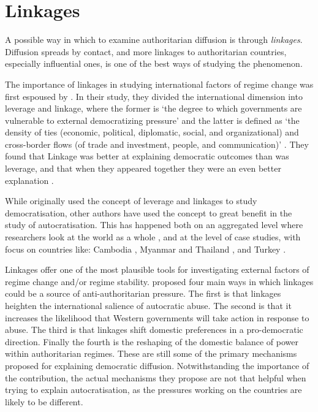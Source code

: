 \section{Linkages}
A possible way in which to examine authoritarian diffusion is through \textit{linkages}. Diffusion spreads by contact, and more linkages to authoritarian countries, especially influential ones, is one of the best ways of studying the phenomenon. 

The importance of linkages in studying international factors of regime change was first espoused by \citet{levitsky_linkage_2006}. In their study, they divided the international dimension into leverage and linkage, where the former is `the degree to which governments are vulnerable to external democratizing pressure' and the latter is defined as `the density of ties (economic, political, diplomatic, social, and organizational) and cross-border flows (of trade and investment, people, and communication)' \citep[p. 379]{levitsky_linkage_2006}. They found that Linkage was better at explaining democratic outcomes than was leverage, and that when they appeared together they were an even better explanation \citep[pp. 388]{levitsky_linkage_2006}.

While \citeauthor{levitsky_linkage_2006} originally used the concept of leverage and linkages to study democratisation, other authors have used the concept to great benefit in the study of autocratisation. This has happened both on an aggregated level where researchers look at the world as a whole \citep{ambrosio_constructing_2010, hall_authoritarian_2017, tansey_ties_2017}, and at the level of case studies, with focus on countries like: Cambodia \citep{loughlin_chinese_2021}, Myanmar and Thailand \citep{wong_chinese_2019}, and Turkey \citep{yilmaz_authoritarian_2020}. 

Linkages offer one of the most plausible tools for investigating external factors of regime change and/or regime stability. \citet[pp. 383-386]{levitsky_linkage_2006} proposed four main ways in which linkages could be a source of anti-authoritarian pressure. The first is that linkages heighten the international salience of autocratic abuse. The second is that it increases the likelihood that Western governments will take action in response to abuse. The third is that linkages shift domestic preferences in a pro-democratic direction. Finally the fourth is the reshaping of the domestic balance of power within authoritarian regimes. These are still some of the primary mechanisms proposed for explaining democratic diffusion. Notwithstanding the importance of the contribution, the actual mechanisms they propose are not that helpful when trying to explain autocratisation, as the pressures working on the countries are likely to be different. 

